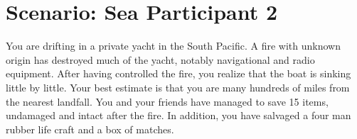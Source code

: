 \documentclass{article}
\begin{document}
    \clearpage
    \section*{Scenario: \textmd{Sea} \hfill Participant \textmd{2}}
    \Large You are drifting in a private yacht in the South Pacific. A fire with unknown origin has destroyed much of the yacht, notably navigational and radio equipment. After having controlled the fire, you realize that the boat is sinking little by little. Your best estimate is that you are many hundreds of miles from the nearest landfall. You and your friends have managed to save 15 items, undamaged and intact after the fire. In addition, you have salvaged a four man rubber life craft and a box of matches.
\clearpage
        
\end{document}
